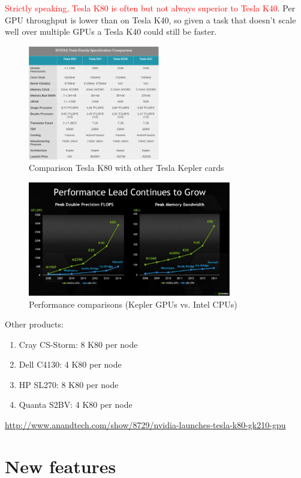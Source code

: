 \textcolor{red}{Strictly speaking, Tesla K80 is often but not always superior to
Tesla K40}.
Per GPU throughput is lower than on Tesla K40, so given a task that doesn't scale
well over multiple GPUs a Tesla K40 could still be faster. 


\begin{figure}[hbt]
  \centerline{\includegraphics[height=5cm,
    angle=0]{./images/Tesla_K80_comparison.eps}}
  \caption{Comparison Tesla K80 with other Tesla Kepler cards}
  \label{fig:Tesla_K80_comparison}
\end{figure}
 

\begin{figure}[hbt]
  \centerline{\includegraphics[height=5cm,
    angle=0]{./images/Kepler_performance.eps}}
  \caption{Performance comparisons (Kepler GPUs vs. Intel CPUs)}
  \label{fig:Kepler_performance}
\end{figure}

Other products:
\begin{enumerate}
  \item Cray CS-Storm: 8 K80 per node
  \item Dell C4130: 4 K80 per node
  \item HP SL270: 8 K80 per node
  \item Quanta S2BV: 4 K80 per node
\end{enumerate}
\url{http://www.anandtech.com/show/8729/nvidia-launches-tesla-k80-gk210-gpu}
 
\section{New features}

